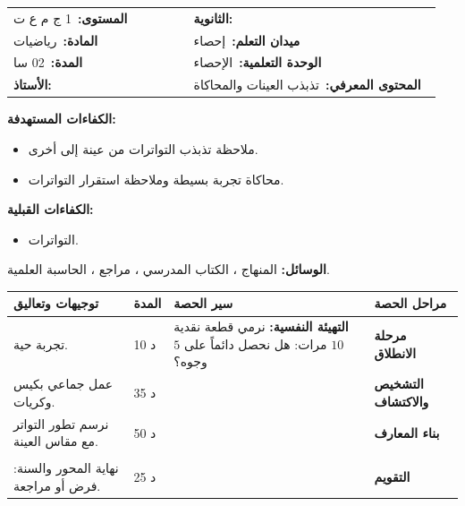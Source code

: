 \documentclass[12pt,a4paper]{article}
\makeatletter
\newenvironment{LTR}{\begin{otherlanguage}{english}}{\end{otherlanguage}}
\newcommand{\ar}[1]{\foreignlanguage{arabic}{#1}}
\newcommand{\Phase}[1]{\textbf{#1}}
\newcommand{\Fld}[2]{\textbf{#1:}\ #2}
\newcommand{\ModhHead}[9]{%
\begin{LTR}
\begin{tcolorbox}[enhanced,colback=white,colframe=cThm!85!black,arc=4mm,boxrule=1pt,top=14pt,bottom=6pt,left=8pt,right=8pt,
 overlay={\node[fill=cThm!85!black,text=white,rounded corners=3mm,inner xsep=14pt,inner ysep=4pt,font=\large\bfseries] at ([yshift=0pt]frame.north){\ar{مذكرة رقم #1}};},
 before upper={\selectlanguage{arabic}}]
\begin{tabular}{@{}p{0.4\linewidth}p{0.55\linewidth}@{}}
\Fld{المستوى}{#2} & \Fld{الثانوية}{\dotfill}\\[3pt]
\Fld{المادة}{رياضيات} & \Fld{ميدان التعلم}{#3}\\[3pt]
\Fld{المدة}{#5} & \Fld{الوحدة التعلمية}{#4}\\[3pt]
\Fld{الأستاذ}{\dotfill} & \Fld{المحتوى المعرفي}{#6}\\
\end{tabular}
\end{tcolorbox}
\begin{tcolorbox}[enhanced,colback=white,colframe=cThm!85!black,arc=3mm,boxrule=0.8pt,sidebyside,sidebyside align=top,lefthand ratio=0.5,
 segmentation style={dashed,cThm!60},before upper={\selectlanguage{arabic}},before lower={\selectlanguage{arabic}}]
\textbf{الكفاءات المستهدفة:}\par #8
\tcblower
\textbf{الكفاءات القبلية:}\par #7
\end{tcolorbox}
\end{LTR}
\par\smallskip\textbf{الوسائل:} #9\par\smallskip}
\newenvironment{Sayr}{%
\begin{LTR}\renewcommand{\arraystretch}{1.25}
\begin{longtable}{|p{0.17\textwidth}|>{\centering\arraybackslash}p{0.06\textwidth}|p{0.53\textwidth}|>{\centering\arraybackslash}p{0.12\textwidth}|}
\hline\rowcolor{cThm!12}\ar{\textbf{توجيهات وتعاليق}} & \ar{\textbf{المدة}} & \ar{\textbf{سير الحصة}} & \ar{\textbf{مراحل الحصة}}\\\hline\endhead
\hline\endfoot}{\end{longtable}\end{LTR}}
\newcommand{\Row}[4]{\ar{\small #4} & \ar{#3} & \ar{#2} & \cellcolor{cThm!8}\ar{\Phase{#1}}\\\hline}
\newcommand{\Lab}[2]{\foreignlanguage{english}{\tcbox[on line,colback=#1,colframe=#1,boxrule=0pt,arc=2pt,boxsep=1pt,left=5pt,right=5pt,top=1pt,bottom=1pt]{\ar{\textcolor{white}{\textbf{#2}}}}}}
\newcommand{\ck}{\ensuremath{{\color{cRem}\checkmark}}}
\makeatother
\begin{document}
\newpage
\ModhHead{52}{1 ج م ع ت}{إحصاء}{الإحصاء}{02 سا}{تذبذب العينات والمحاكاة}%
{\begin{itemize}\item التواترات.\end{itemize}}%
{\begin{itemize}\item ملاحظة تذبذب التواترات من عينة إلى أخرى.\item محاكاة تجربة بسيطة وملاحظة استقرار التواترات.\end{itemize}}%
{المنهاج ، الكتاب المدرسي ، مراجع ، الحاسبة العلمية.}
\begin{Sayr}
\Row{مرحلة الانطلاق}{%
\textbf{التهيئة النفسية:} نرمي قطعة نقدية $10$ مرات: هل نحصل دائماً على $5$ وجوه؟}{10 د}{تجربة حية.}
\Row{التشخيص والاكتشاف}{%
\Lab{cEx}{مناقشة النشاطين 06 و 07 صفحة 140}\par\ck\ كيس به كريات بألوان مختلفة: كل تلميذ يسحب عينة ويحسب التواترات: النتائج تختلف من عينة إلى أخرى (\textbf{تذبذب العينات}).\par
\ck\ بتجميع عينات القسم (عينة كبيرة) تقترب التواترات من قيم ثابتة.\par
}{35 د}{عمل جماعي بكيس وكريات.}
\Row{بناء المعارف}{%
\Lab{cDef}{تعريف}\ \textbf{العينة} جزء من المجتمع ؛ \textbf{مقاس العينة} عدد عناصرها ؛ \textbf{المحاكاة} تعويض تجربة بتجربة أخرى لها نفس الخواص (قطعة نقدية ، نرد ، أعداد عشوائية بالحاسبة).\par\Lab{cThm}{ملاحظة تجريبية}\ كلما كبر مقاس العينة قلّ تذبذب التواترات واقتربت من قيمة ثابتة.\par}{50 د}{نرسم تطور التواتر مع مقاس العينة.}
\Row{}{%
\Lab{cEx}{مثال}\ محاكاة رمي قطعة نقدية بالحاسبة: نولّد أعداداً عشوائية (الزر \textsc{Ran\#}) ونرفق «وجه» بالعدد إذا كان أقل من $0{,}5$.\par\Lab{cThm!80!black}{حذار}\ النتيجة الملاحظة على عينة صغيرة ليست قاعدة عامة.}{}{}
\Row{التقويم}{%
\Lab{cEx}{تطبيق}\par كل تلميذ يرمي قطعة نقدية $20$ مرة ويسجل تواتر الوجه ، ثم نجمع نتائج القسم. قارن تواتر التلميذ بتواتر القسم.\par\textbf{الحل المنتظر:} تواترات التلاميذ متذبذبة (مثلاً من $0{,}3$ إلى $0{,}7$) ، وتواتر القسم قريب من $0{,}5$.\par\textbf{واجب منزلي:} تمارين حوصلة المحور من الكتاب المدرسي.\par\smallskip\textbf{ملاحظات حول سير الحصة:} \dotfill}{25 د}{نهاية المحور والسنة: فرض أو مراجعة.}
\end{Sayr}
\end{document}

